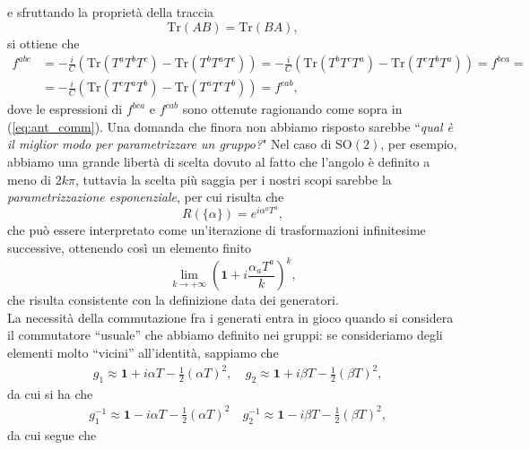 e sfruttando la proprietà della traccia
\begin{equation}
    \text{Tr}(AB) = \text{Tr}(BA),
\end{equation}
si ottiene che
\begin{align}
    f^{abc} &= - \frac{i}{C} (\text{Tr}(T^a T^b T^c) - \text{Tr}(T^b T^a T^c)) = - \frac{i}{C} (\text{Tr}(T^b T^c T^a) - \text{Tr}(T^c T^b T^a)) = f^{bca} = \\
    &= - \frac{i}{C} (\text{Tr}(T^c T^a T^b) - \text{Tr}(T^a T^c T^b)) = f^{cab},
\end{align}
dove le espressioni di $f^{bca}$ e $f^{cab}$ sono ottenute ragionando come sopra in (\ref{eq:ant_comm}).
Una domanda che finora non abbiamo risposto sarebbe ``\emph{qual è il miglior modo per parametrizzare un gruppo?}" Nel caso di $\text{SO}(2)$, per esempio, abbiamo una grande libertà di scelta dovuto al fatto che l'angolo è definito a
meno di $2 k \pi$, tuttavia la scelta più saggia per i nostri scopi sarebbe la \emph{parametrizzazione esponenziale}, per cui risulta che
\begin{equation}
    R(\{ \alpha \}) = e^{i \alpha^a T^a},
\end{equation}
che può essere interpretato come un'iterazione di trasformazioni infinitesime successive, ottenendo così un elemento finito
\begin{equation}
    \lim_{k \to + \infty} \left( \mathbf{1} + i \frac{\alpha_a T^a}{k} \right)^k,
\end{equation}
che risulta consistente con la definizione data dei generatori. \\
La necessità della commutazione fra i generati entra in gioco quando si considera il commutatore ``usuale'' che abbiamo definito nei gruppi: se consideriamo degli elementi molto ``vicini'' all'identità, sappiamo che
\begin{align}
&g_1 \approx \mathbf{1} + i \alpha T - \frac{1}{2}(\alpha T)^2, \
&g_2 \approx \mathbf{1} + i \beta T - \frac{1}{2}(\beta T)^2,
\end{align}
da cui si ha che
\begin{align}
&g_1^{-1} \approx \mathbf{1} - i \alpha T - \frac{1}{2}(\alpha T)^2 \
&g_2^{-1} \approx \mathbf{1} - i \beta T - \frac{1}{2}(\beta T)^2,
\end{align}
da cui segue che
